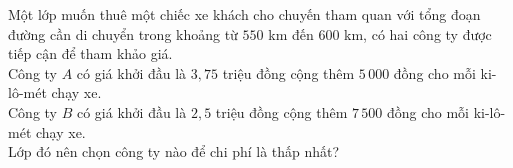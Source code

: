 \begin{ex}%
	Một lớp muốn thuê một chiếc xe khách cho chuyến tham quan với tổng đoạn đường cần di chuyển trong khoảng từ $ 550 $ km đến $ 600 $ km, có hai công ty được tiếp cận để tham khảo giá.\\
	Công ty $ A $ có giá khởi đầu là $ 3{,}75 $ triệu đồng cộng thêm $ 5\,000 $ đồng cho mỗi ki-lô-mét chạy xe.\\
	Công ty $ B $ có giá khởi đầu là $ 2{,}5 $ triệu đồng cộng thêm $ 7\,500 $ đồng cho mỗi ki-lô-mét chạy xe.\\
	Lớp đó nên chọn công ty nào để chi phí là thấp nhất?
\end{ex}
